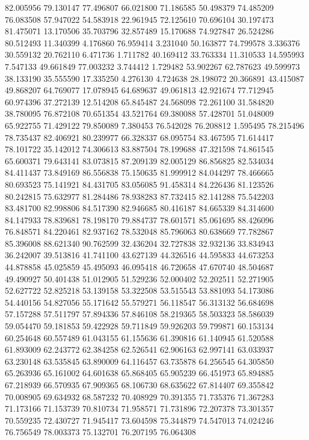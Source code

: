 82.005956
79.130147
77.496807
66.021800
71.186585
50.498379
74.485209
76.083508
57.947022
54.583918
22.961945
72.125610
70.696104
30.197473
81.475071
13.170506
35.703796
32.857489
15.170688
74.927847
26.524286
80.512493
11.340399
4.176860
76.959414
3.231040
50.163877
74.799578
3.336376
30.559132
20.762110
6.471736
1.711782
40.169412
33.763334
11.310533
14.595993
7.547133
49.661849
77.003232
3.744412
1.729482
53.902267
62.787623
49.599973
38.133190
35.555590
17.335250
4.276130
4.724638
28.198072
20.366891
43.415087
49.868207
64.769077
17.078945
64.689637
49.061813
42.921674
77.712945
60.974396
37.272139
12.514208
65.845487
24.568098
72.261100
31.584820
38.780095
76.872108
70.651354
43.521764
69.380088
57.428701
51.048009
65.922755
71.429122
79.850089
7.380453
76.542028
76.208812
1.595495
78.215496
78.735437
82.406921
80.239977
66.328337
68.095754
83.467595
71.614417
78.101722
35.142012
74.306613
83.887504
78.199688
47.321598
74.861545
65.600371
79.643141
83.073815
87.209139
82.005129
86.856825
82.534034
84.411437
73.849169
86.556838
75.150635
81.999912
84.044297
78.466665
80.693523
75.141921
84.431705
83.056085
91.458314
84.226436
81.123526
80.242815
75.632977
81.284486
78.938283
87.732415
82.141288
75.542203
83.481700
82.998806
84.517390
82.946685
80.416187
84.665339
84.314600
84.147933
78.839681
78.198170
79.884737
78.601571
85.061695
88.426096
76.848571
84.220461
82.937162
78.532048
85.796063
80.638669
77.782867
85.396008
88.621340
90.762599
32.436204
32.727838
32.932136
33.834943
36.242007
39.513816
41.741100
43.627139
44.326516
44.595833
44.673253
44.878858
45.025859
45.495093
46.095418
46.720658
47.670740
48.504687
49.490927
50.401438
51.012905
51.529236
52.000402
52.202511
52.271905
52.627722
52.825218
53.139158
53.322508
53.515543
53.881093
54.173086
54.440156
54.827056
55.171642
55.579271
56.118547
56.313132
56.684698
57.157288
57.511797
57.894336
57.846108
58.219365
58.503323
58.586039
59.054470
59.181853
59.422928
59.711849
59.926203
59.799871
60.153134
60.254648
60.557489
61.043155
61.155636
61.390816
61.140945
61.520588
61.893009
62.243772
62.384258
62.526541
62.906163
62.997141
63.033937
63.230148
63.535845
63.890009
64.116457
63.735878
64.256545
64.305850
65.263936
65.161002
64.601638
65.868405
65.905239
66.451973
65.894885
67.218939
66.570935
67.909365
68.106730
68.635622
67.814407
69.355842
70.008905
69.634932
68.587232
70.408929
70.391355
71.735376
71.367283
71.173166
71.153739
70.810734
71.958571
71.731896
72.207378
73.301357
70.559235
72.430727
71.945417
73.604598
75.344879
74.547013
74.024246
76.756549
78.003373
75.132701
76.207195
76.064308
